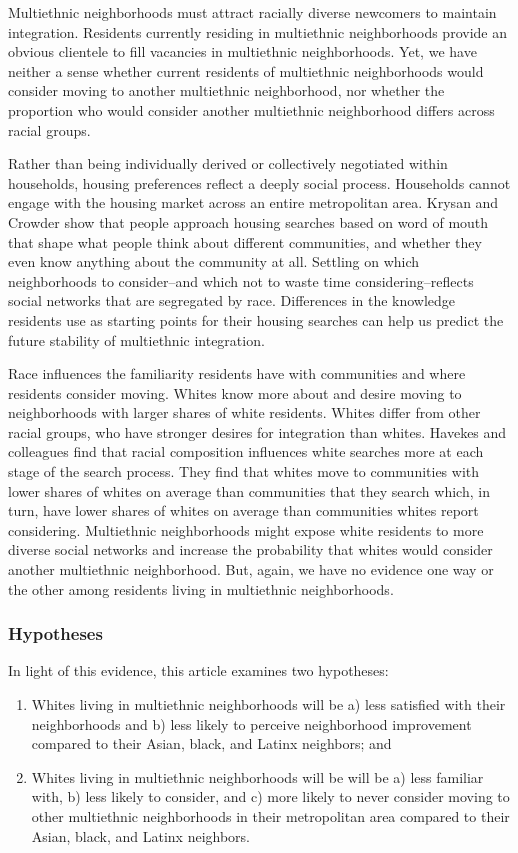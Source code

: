 \documentclass{baderart}
\providecommand{\tightlist}{%
  \setlength{\itemsep}{0pt}\setlength{\parskip}{0pt}}
\begin{document}
Multiethnic neighborhoods must attract racially diverse newcomers to maintain integration. Residents currently residing in multiethnic neighborhoods provide an obvious clientele to fill vacancies in multiethnic neighborhoods. Yet, we have neither a sense whether current residents of multiethnic neighborhoods would consider moving to another multiethnic neighborhood, nor whether the proportion who would consider another multiethnic neighborhood differs across racial groups.

Rather than being individually derived or collectively negotiated within households, housing preferences reflect a deeply social process. Households cannot engage with the housing market across an entire metropolitan area. Krysan and Crowder show that people approach housing searches based on word of mouth that shape what people think about different communities, and whether they even know anything about the community at all. Settling on which neighborhoods to consider--and which not to waste time considering--reflects social networks that are segregated by race. Differences in the knowledge residents use as starting points for their housing searches can help us predict the future stability of multiethnic integration.

Race influences the familiarity residents have with communities and where residents consider moving. Whites know more about and desire moving to neighborhoods with larger shares of white residents. Whites differ from other racial groups, who have stronger desires for integration than whites. Havekes and colleagues find that racial composition influences white searches more at each stage of the search process. They find that whites move to communities with lower shares of whites on average than communities that they search which, in turn, have lower shares of whites on average than communities whites report considering. Multiethnic neighborhoods might expose white residents to more diverse social networks and increase the probability that whites would consider another multiethnic neighborhood. But, again, we have no evidence one way or the other among residents living in multiethnic neighborhoods.

\subsubsection{Hypotheses}\label{hypotheses}

In light of this evidence, this article examines two hypotheses:


\begin{enumerate} \def\labelenumi{\arabic{enumi}.} \tightlist \item   Whites living in multiethnic neighborhoods will be a) less satisfied   with their neighborhoods and b) less likely to perceive neighborhood   improvement compared to their Asian, black, and Latinx neighbors; and \item   Whites living in multiethnic neighborhoods will be will be a) less   familiar with, b) less likely to consider, and c) more likely to never   consider moving to other multiethnic neighborhoods in their   metropolitan area compared to their Asian, black, and Latinx   neighbors. \end{enumerate}
\end{document}
